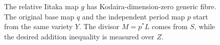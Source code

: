 \begin{figure}[ht]
\centering
{}
\caption{The relative Iitaka map $g$ has Kodaira-dimension-zero
generic fibre. The original base map $q$ and the independent period
map $p$ start from the same variety $Y$. The divisor $M=p^*L$
comes from $S$, while the desired addition inequality is measured
over $Z$.}
\label{fig:two-bases}
\end{figure}
